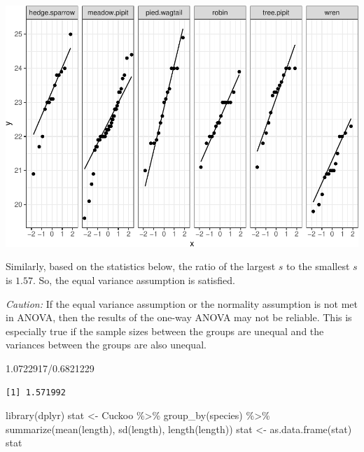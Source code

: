 \documentclass[
]{book}
\newenvironment{Shaded}{\begin{snugshade}}{\end{snugshade}}
\newcommand{\FloatTok}[1]{\textcolor[rgb]{0.00,0.00,0.81}{#1}}
\newcommand{\FunctionTok}[1]{\textcolor[rgb]{0.00,0.00,0.00}{#1}}
\newcommand{\NormalTok}[1]{#1}
\newcommand{\OtherTok}[1]{\textcolor[rgb]{0.56,0.35,0.01}{#1}}
\newcommand{\SpecialCharTok}[1]{\textcolor[rgb]{0.00,0.00,0.00}{#1}}
\begin{document}
\includegraphics[width=1\linewidth]{Class_Activity_24_files/figure-latex/unnamed-chunk-3-1}

Similarly, based on the statistics below, the ratio of the largest \(s\) to the smallest \(s\) is \(1.57\). So, the equal variance assumption is satisfied.

\emph{Caution:} If the equal variance assumption or the normality assumption is not met in ANOVA, then the results of the one-way ANOVA may not be reliable. This is especially true if the sample sizes between the groups are unequal and the variances between the groups are also unequal.

\begin{Shaded}
\begin{Highlighting}[]
\FloatTok{1.0722917}\SpecialCharTok{/}\FloatTok{0.6821229}
\end{Highlighting}
\end{Shaded}

\begin{verbatim}
[1] 1.571992
\end{verbatim}

\begin{Shaded}
\begin{Highlighting}[]
\FunctionTok{library}\NormalTok{(dplyr)}
\NormalTok{stat }\OtherTok{\textless{}{-}}\NormalTok{ Cuckoo }\SpecialCharTok{\%\textgreater{}\%} \FunctionTok{group\_by}\NormalTok{(species) }\SpecialCharTok{\%\textgreater{}\%} \FunctionTok{summarize}\NormalTok{(}\FunctionTok{mean}\NormalTok{(length), }\FunctionTok{sd}\NormalTok{(length), }\FunctionTok{length}\NormalTok{(length))}
\NormalTok{stat }\OtherTok{\textless{}{-}} \FunctionTok{as.data.frame}\NormalTok{(stat)}
\NormalTok{stat}
\end{Highlighting}
\end{Shaded}
\end{document}
